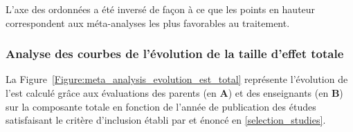 L'axe des ordonnées a été inversé de façon à ce que les points en hauteur correspondent aux méta-analyses les plus favorables au traitement.


\subsubsection{Analyse des courbes de l'évolution de la taille d'effet totale}

La Figure~\ref{Figure:meta_analysis_evolution_est_total} représente l'évolution de l'\gls{est} calculé grâce aux évaluations des parents (en \textbf{A}) et des 
enseignants (en \textbf{B}) sur la composante totale en fonction de l'année de publication des études satisfaisant le critère d'inclusion établi par \citep{Cortese2016} et énoncé en 
\ref{selection_studies}.

